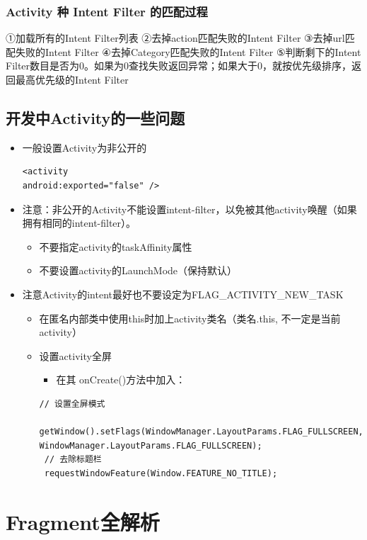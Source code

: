 \documentclass[9pt, b5paper]{article}
\begin{document}
\subsubsection{Activity 种 Intent Filter 的匹配过程}
\label{sec-1-4-2}
①加载所有的Intent Filter列表
②去掉action匹配失败的Intent Filter
③去掉url匹配失败的Intent Filter
④去掉Category匹配失败的Intent Filter
⑤判断剩下的Intent Filter数目是否为0。如果为0查找失败返回异常；如果大于0，就按优先级排序，返回最高优先级的Intent Filter

\subsection{开发中Activity的一些问题}
\label{sec-1-5}
\begin{itemize}
\item 一般设置Activity为非公开的
\begin{verbatim}
<activity  
android:exported="false" />
\end{verbatim}
\item 注意：非公开的Activity不能设置intent-filter，以免被其他activity唤醒（如果拥有相同的intent-filter）。
\begin{itemize}
\item 不要指定activity的taskAffinity属性
\item 不要设置activity的LaunchMode（保持默认）
\end{itemize}
\item 注意Activity的intent最好也不要设定为FLAG\_ACTIVITY\_NEW\_TASK
\begin{itemize}
\item 在匿名内部类中使用this时加上activity类名（类名.this, 不一定是当前activity）
\item 设置activity全屏
\begin{itemize}
\item 在其 onCreate()方法中加入：
\end{itemize}
\begin{verbatim}
// 设置全屏模式
 getWindow().setFlags(WindowManager.LayoutParams.FLAG_FULLSCREEN, WindowManager.LayoutParams.FLAG_FULLSCREEN); 
 // 去除标题栏
 requestWindowFeature(Window.FEATURE_NO_TITLE);
\end{verbatim}
\end{itemize}
\end{itemize}

\section{Fragment全解析}
\label{sec-2}
\end{document}
